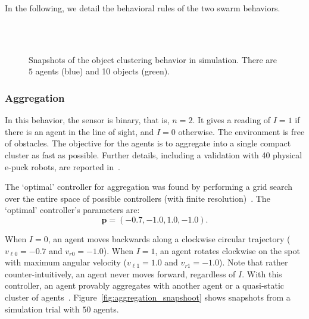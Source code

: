 In the following, we detail the behavioral rules of the two swarm behaviors.

\captionsetup[subfigure]{labelformat=empty}  
\begin{figure}[!t]
	\centering
	\\
	\\
	\caption{Snapshots of the object clustering behavior in simulation. There are $5$ agents (blue) and 10 objects (green).}
	\label{fig:clustering_snapshoot}
\end{figure}

\subsubsection{Aggregation}\label{sec:aggregation_behavior}
%
In this behavior, the sensor is binary, that is, $n=2$. It gives a reading of $I=1$ if there is an agent in the line of sight, and $I=0$ otherwise. The environment is free of obstacles. The objective for the agents is to aggregate into a single compact cluster as fast as possible. Further details, including a validation with 40 physical e-puck robots, are reported in~\cite{Gauci2014_ijrr}. %

The `optimal' controller for aggregation was found by performing a grid search over the entire space of possible controllers (with finite resolution)~\cite{Gauci2014_ijrr}. The `optimal' controller's parameters are:
\begin{equation}\label{eq:aggregation_optimal_controller}
\mathbf{p} = \left(-0.7, -1.0, 1.0, -1.0\right). 
\end{equation}

When $I=0$, an agent moves backwards along a clockwise circular trajectory ($v_{\ell0} = -0.7$ and $v_{r0} = -1.0$). When $I=1$, an agent rotates clockwise on the spot with maximum angular velocity ($v_{\ell1} = 1.0$ and $v_{r1} = -1.0$). Note that rather counter-intuitively, an agent never moves forward, regardless of $I$. With this controller, an agent provably aggregates with another agent or a quasi-static cluster of agents~\cite{Gauci2014_ijrr}. Figure~\ref{fig:aggregation_snapshoot} shows snapshots from a simulation trial with $50$ agents.

